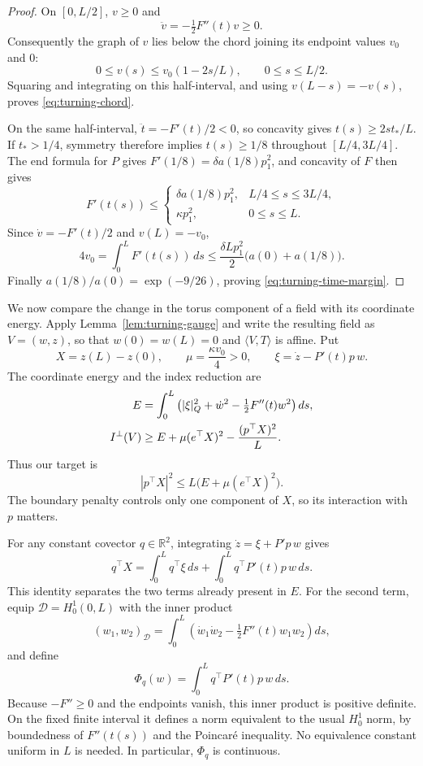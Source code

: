 \begin{proof}
On $[0,L/2]$, $v\ge0$ and
\[
 \ddot v=-\tfrac12F''(t)v\ge0.
\]
Consequently the graph of $v$ lies below the chord joining its endpoint
values $v_0$ and $0$:
\[
 0\le v(s)\le v_0(1-2s/L),\qquad 0\le s\le L/2.
\]
Squaring and integrating on this half-interval, and using
$v(L-s)=-v(s)$, proves \eqref{eq:turning-chord}.

On the same half-interval, $\ddot t=-F'(t)/2<0$, so concavity gives
$t(s)\ge 2st_*/L$.  If $t_*>1/4$, symmetry therefore implies
$t(s)\ge1/8$ throughout $[L/4,3L/4]$.  The end formula for $P$ gives
$F'(1/8)=\delta a(1/8)p_1^2$, and concavity of $F$ then gives
\[
 F'(t(s))\le
 \begin{cases}
 \delta a(1/8)p_1^2,&L/4\le s\le3L/4,\\
 \kappa p_1^2,&0\le s\le L.
 \end{cases}
\]
Since $\dot v=-F'(t)/2$ and $v(L)=-v_0$,
\[
 4v_0=\int_0^L F'(t(s))\,ds
 \le \frac{\delta Lp_1^2}{2}\bigl(a(0)+a(1/8)\bigr).
\]
Finally $a(1/8)/a(0)=\exp(-9/26)$, proving
\eqref{eq:turning-time-margin}.
\end{proof}

We now compare the change in the torus component of a field with its
coordinate energy.  Apply Lemma~\ref{lem:turning-gauge} and write the
resulting field as $V=(w,z)$, so that $w(0)=w(L)=0$ and
$\langle V,T\rangle$ is affine.  Put
\[
 X=z(L)-z(0),\qquad \mu=\frac{\kappa v_0}{4}>0,\qquad
 \xi=\dot z-P'(t)p\,w.
\]
The coordinate energy and the index reduction are
\begin{align}
 E&=\int_0^L\left(|\xi|_Q^2+\dot w^2
                         -\tfrac12F''(t)w^2\right)ds,\notag\\
 I^\perp(V)&\ge E+\mu(e^\top X)^2
                         -\frac{(p^\top X)^2}{L}.
 \label{eq:turning-target}
\end{align}
Thus our target is
\[
 |p^\top X|^2\le L\bigl(E+\mu(e^\top X)^2\bigr).
\]
The boundary penalty controls only one component of $X$, so its
interaction with $p$ matters.

For any constant covector $q\in\mathbb R^2$, integrating
$\dot z=\xi+P'p\,w$ gives
\[
 q^\top X=\int_0^L q^\top\xi\,ds
              +\int_0^L q^\top P'(t)p\,w\,ds.
\]
This identity separates the two terms already present in $E$.
For the second term, equip $\mathcal D=H_0^1(0,L)$ with the inner product
\[
 (w_1,w_2)_{\mathcal D}
 =\int_0^L\left(\dot w_1\dot w_2
                   -\tfrac12F''(t)w_1w_2\right)ds,
\]
and define
\[
 \Phi_q(w)=\int_0^L q^\top P'(t)p\,w\,ds.
\]
Because $-F''\ge0$ and the endpoints vanish, this inner product is
positive definite.  On the fixed finite interval it defines a norm
equivalent to the usual $H_0^1$ norm, by boundedness of $F''(t(s))$
and the Poincar\'e inequality.  No equivalence constant uniform in
$L$ is needed.  In particular, $\Phi_q$ is continuous.

